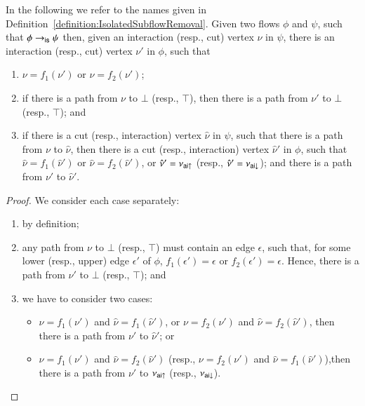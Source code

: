 \begin{lemma}\label{lemma:IsolatedSubflowRemovalPaths}
In the following we refer to the names given in Definition~\vref{definition:IsolatedSubflowRemoval}.
Given two flows $\phi$ and $\psi$, such that $\phi\to_{\mathsf{is}}\psi$ then, given an interaction (resp., cut) vertex $\nu$ in $\psi$, there is an interaction (resp., cut) vertex $\nu'$ in $\phi$, such that
\begin{enumerate}
\item $\nu=f_1(\nu')$ or $\nu=f_2(\nu')$;
\item if there is a path from $\nu$ to $\bot$ (resp., $\top$), then there is a path from $\nu'$ to $\bot$ (resp., $\top$); and
\item if there is a cut (resp., interaction) vertex $\hat\nu$ in $\psi$, such that there is a path from $\nu$ to $\hat\nu$, then there is a cut (resp., interaction) vertex $\hat\nu'$ in $\phi$, such that $\hat\nu=f_1(\hat\nu')$ or $\hat\nu=f_2(\hat\nu')$, or $\hat\nu'=\nu_{{\mathsf{ai}}{\uparrow}}$ (resp., $\hat\nu'=\nu_{{\mathsf{ai}}{\downarrow}}$); and there is a path from $\nu'$ to $\hat\nu'$.
\end{enumerate}
\end{lemma}

\begin{proof}
We consider each case separately:
\begin{enumerate}
 \item by definition;
 \item any path from $\nu$ to $\bot$ (resp., $\top$) must contain an edge $\epsilon$, such that, for some lower (resp., upper) edge $\epsilon'$ of $\phi$, $f_1(\epsilon')=\epsilon$ or $f_2(\epsilon')=\epsilon$. Hence, there is a path from $\nu'$ to $\bot$ (resp., $\top$); and
 \item we have to consider two cases:
 \begin{itemize}
  \item $\nu=f_1(\nu')$ and $\hat\nu=f_1(\hat\nu')$, or $\nu=f_2(\nu')$ and $\hat\nu=f_2(\hat\nu')$, then there is a path from $\nu'$ to $\hat\nu'$; or
  \item $\nu=f_1(\nu')$ and $\hat\nu=f_2(\hat\nu')$ (resp., $\nu=f_2(\nu')$ and $\hat\nu=f_1(\hat\nu')$),then there is a path from $\nu'$ to $\nu_{{\mathsf{ai}}{\uparrow}}$ (resp., $\nu_{{\mathsf{ai}}{\downarrow}}$).
 \end{itemize}
\end{enumerate}
\end{proof}

